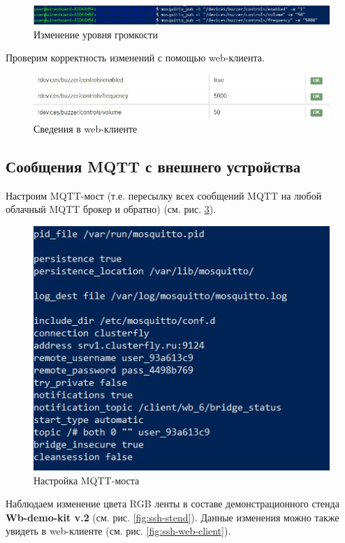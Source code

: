 \documentclass[a4paper,14pt]{extarticle}
\begin{document}
\begin{figure}[htbp]
	\centering
	\includegraphics[width=0.9\linewidth]{images/ssh-powershell3.2}
	\caption{Изменение уровня громкости}
	\label{fig:ssh-powershell3.2}
\end{figure}
Проверим корректность изменений с помощью web-клиента.
\begin{figure}[htbp]
	\centering
	\includegraphics[width=0.8\linewidth]{images/ssh-powershell3.3}
	\caption{Сведения в web-клиенте}
	\label{fig:ssh-powershell3}
\end{figure}	

\subsection{Сообщения MQTT с внешнего устройства}

Настроим MQTT-мост (т.е. пересылку всех сообщений MQTT на любой облачный MQTT
брокер и обратно) (см. рис. \ref{fig:ssh-config}).
\begin{figure}[htbp]
	\centering
	\includegraphics[width=0.6\linewidth]{images/ssh-powershell4}
	\caption{Настройка MQTT-моста}
	\label{fig:ssh-config}
\end{figure}

Наблюдаем изменение цвета RGB ленты в составе демонстрационного стенда \textbf{Wb-demo-kit v.2} (см. рис. \ref{fig:ssh-stend}). Данные изменения можно также увидеть в web-клиенте (см. рис. \ref{fig:ssh-web-client}).
\end{document}
